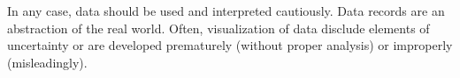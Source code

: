 In any case, data should be used and interpreted cautiously. Data records are an abstraction of the real world\cite{Lupi2017}. %
Often, visualization of data disclude elements of uncertainty\cite{Meeks2019} %
or are developed prematurely (without proper analysis) or improperly (misleadingly)\cite{Borner2019,Monmonier2018}.  %
